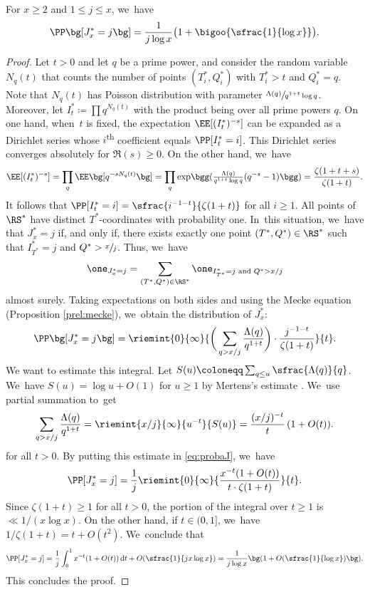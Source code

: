 \begin{lem}
\label{lem:probaj}
For $x \ge 2$ and $1 \le j \le x$, we~have
\[
\PP\bg[J_x^*=j\bg] = \frac{1}{j\log x}\bigl(1+\bigoo{\sfrac{1}{\log x}} \bigr).
\]
\end{lem}

\begin{proof}
Let $t>0$ and let $q$ be a prime power, and consider the random variable $N_q(t)$ that counts the number of points $(T^*_i, Q^*_i)$ with $T^*_i > t$ and $Q^*_i = q$. Note that $N_q(t)$ has Poisson distribution with parameter $\sfrac{\Lambda(q)}{q^{1+t}\log q}$. Moreover, let $I^*_t \coloneqq \prod q^{N_q(t)}$ with the product being over all prime powers $q$. On one hand, when~$t$ is fixed, the expectation $\EE[(I^*_t)^{-s}]$ can be expanded as a Dirichlet series whose $i$\textsuperscript{th} coefficient equals $\PP[I^*_t = i]$. This Dirichlet series converges absolutely for $\Re(s)\ge0$. On the other hand, we~have
\[
\EE[(I^*_t)^{-s}] = \prod_q \EE\bg[q^{-sN_q(t)}\bg] = \prod_q \exp\!\bgg(\tfrac{\Lambda(q)}{q^{1+t}\log q} (q^{-s}-1)\bgg) = \frac{\zeta(1+t+s)}{\zeta(1+t)}.
\]
It follows that $\PP[I^*_t = i] = \sfrac{i^{-1-t}}{\zeta(1+t)}$ for all $i \ge 1$. All points of $\RS^*$ have distinct $T^*$-coordinates with probability one. In~this situation, we~have that $J_x^* = j$ if, and only if, there exists exactly one point $(T^*, Q^*) \in \RS^*$ such that $I^*_{T^*} = j$ and $Q^* > \sfrac{x}{j}$. Thus, we~have
\[
\one _{J_x^* = j} = \sum_{(T^*, Q^*) \in \RS^*} \one _{I^*_{T^*} = j \text{ and } Q^{*}> x/j}
\]
almost surely. Taking expectations on both sides and using the Mecke equation (Proposition \ref{prel:mecke}), we~obtain the distribution of $J_x^*$:
\begin{equation}
\label{eq:probaJ}
\PP\bg[J_x^*=j\bg]
= \riemint{0}{\infty}{\bigg(\sum_{q > x/j} \frac{\Lambda(q)}{q^{1+t}}\bigg)\cdot \frac{j^{-1-t}}{\zeta(1+t)}}{t}.
\end{equation}
We want to estimate this integral. Let $S(u) \coloneqq \sum_{q \le u} \sfrac{\Lambda(q)}{q}$. We~have $S(u) = \log u + O(1)$ for $u \ge 1$ by Mertens's estimate \cite[Th.\,3.4(a)]{Koukoulo19}. We~use partial summation to~get
\[
\sum_{q > x/j} \frac{\Lambda(q)}{q^{1+t}} = \riemint{x/j}{\infty}{u^{-t}}{S(u)} = \frac{(x/j)^{-t}}{t}\,(1+O(t)).
\]
for all $t > 0$. By putting this estimate in \eqref{eq:probaJ}, we~have
\[
\PP[J_x^* = j] = \frac{1}{j} \riemint{0}{\infty}{\frac{x^{-t}(1+O(t))}{t\cdot \zeta(1+t)}}{t}.
\]
Since $\zeta(1+t)\ge1$ for all $t>0$, the portion of the integral over $t\ge1$ is $\ll 1/(x\log x)$. On the other hand, if $t\in(0,1]$, we~have $1/\zeta(1+t)=t+O(t^2)$. We~conclude that
\[
\PP[J_x^* = j] = \frac{1}{j} \int_0^1 x^{-t}(1+O(t)) \,\mathrm dt + O(\sfrac{1}{jx\log x}) = \frac{1}{j\log x}\bg(1+O(\sfrac{1}{\log x})\bg).
\]
This concludes the proof.
\end{proof}


